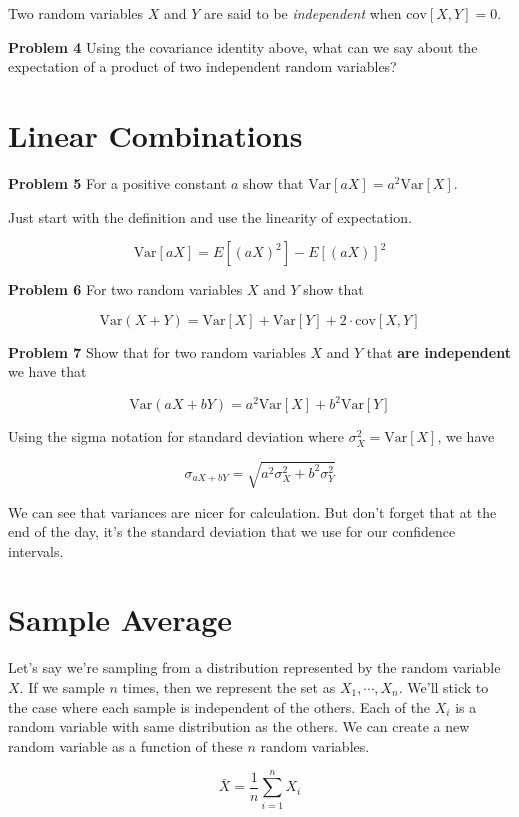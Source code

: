 \documentclass[]{article}
\begin{document}
Two random variables $X$ and $Y$ are said to be
\emph{independent} when $\mbox{cov}[X,Y] = 0$.

\textbf{Problem 4} Using the covariance identity above,
what can we say about the expectation of a product of two
independent random variables?


\section*{Linear Combinations}

\textbf{Problem 5} For a positive constant $a$ show that
$\mbox{Var}[aX] = a^2 \mbox{Var}[X]$.

Just start with the definition and use the linearity of
expectation.

$$
\mbox{Var}[aX] = E\left[(aX)^2\right] - E[(aX)]^2
$$


\textbf{Problem 6} For two random variables $X$ and $Y$
show that

$$
\mbox{Var}(X+Y) = \mbox{Var}[X] + \mbox{Var}[Y]
                + 2 \cdot \mbox{cov}[X,Y]
$$

\textbf{Problem 7} Show that for two random variables
$X$ and $Y$ that \textbf{are independent} we have that

$$
\mbox{Var}(aX+bY) = a^2\mbox{Var}[X] + b^2\mbox{Var}[Y]
$$

Using the sigma notation for standard deviation
where $\sigma_X^2 = \mbox{Var}[X]$, we have

$$
\sigma_{aX+bY} = \sqrt{a^2 \sigma_X^2 + b^2 \sigma_Y^2}
$$

We can see that variances are nicer for calculation.
But don't forget that at the end of the day, it's the
standard deviation that we use for our confidence intervals.

\section*{Sample Average}

Let's say we're sampling from a distribution represented by
the random variable $X$.  If we sample $n$ times, then we
represent the set as $X_1, \cdots, X_n$.  We'll stick to the
case where each sample is independent of the others.  Each
of the $X_i$ is a random variable with same distribution as
the others.  We can create a new random variable as a function
of these $n$ random variables.

\begin{equation} \label{sample_avg}
\bar{X} = \frac{1}{n} \sum_{i=1}^n X_i
\end{equation}
\end{document}
